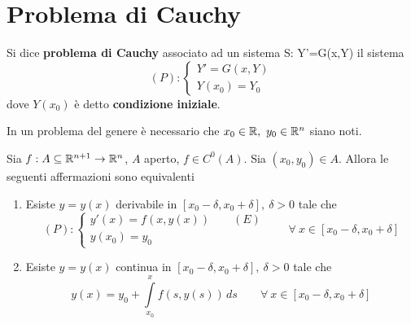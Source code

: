 \section{Problema di Cauchy}
\begin{definition}
    Si dice \textbf{problema di Cauchy} associato ad un sistema S: Y'=G(x,Y) il sistema
    \begin{equation}
       (P): \begin{cases}
            Y'=G(x, Y)\\
            Y(x_0)=Y_0
        \end{cases}
    \end{equation}
    dove $Y(x_0)$ è detto \textbf{condizione iniziale}.
\end{definition}
\begin{oss}
In un problema del genere è necessario che $x_0 \in \mathbb{R},\ y_0 \in \mathbb{R}^n$ siano noti.
\end{oss}
\begin{lemma} \label{Lemma: Formulazione integrale del problema di Cauchy}
    Sia $f: A \subseteq \mathbb{R}^{n+1} \to \mathbb{R}^n$, $A$ aperto, $f \in C^0(A)$. Sia $(x_0, y_0) \in A$. Allora le seguenti affermazioni sono equivalenti
    \begin{enumerate}
        \item Esiste $y=y(x)$ derivabile in $[x_0-\delta, x_0+\delta],\ \delta>0$ tale che 
        \begin{equation}
            (P): \begin{cases}
                y'(x)=f(x, y(x)) \qquad (E)\\
                y(x_0)=y_0 
            \end{cases}
            \qquad \forall\ x \in [x_0-\delta, x_0+\delta]
        \end{equation}
        \item Esiste $y=y(x)$ continua in $[x_0-\delta, x_0+\delta],\ \delta>0$ tale che 
        \begin{equation} \label{Eq: Equazione integrale di Volterra}
            y(x)= y_0 + \int\limits_{x_0}^{x}{f(s, y(s))}\, ds \qquad \forall\ x \in [x_0-\delta, x_0+\delta]
        \end{equation}
    \end{enumerate}
\end{lemma}
